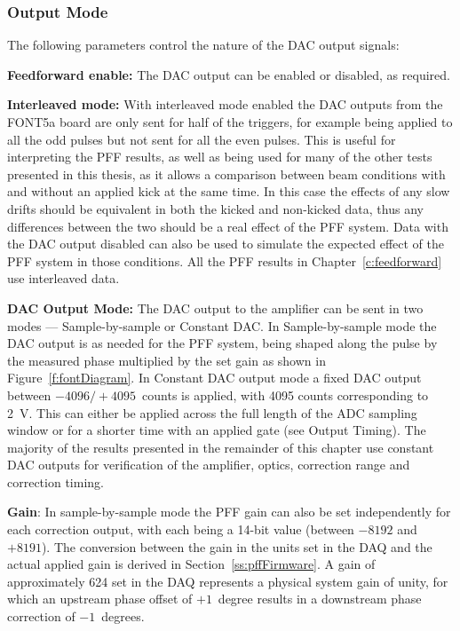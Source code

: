 \subsubsection{Output Mode}

The following parameters control the nature of the DAC output signals:

\textbf{Feedforward enable:} The DAC output can be enabled or disabled, as required.

\textbf{Interleaved mode:} With interleaved mode enabled the DAC outputs from the FONT5a board are only sent for half of the triggers, for example being applied to all the odd pulses but not sent for all the even pulses. This is useful for interpreting the PFF results, as well as being used for many of the other tests presented in this thesis, as it allows a comparison between beam conditions with and without an applied kick at the same time. In this case the effects of any slow drifts should be equivalent in both the kicked and non-kicked data, thus any differences between the two should be a real effect of the PFF system. Data with the DAC output disabled can also be used to simulate the expected effect of the PFF system in those conditions. All the PFF results in Chapter~\ref{c:feedforward} use interleaved data.

\textbf{DAC Output Mode:} The DAC output to the amplifier can be sent in two modes --- Sample-by-sample or Constant DAC. In Sample-by-sample mode the DAC output is as needed for the PFF system, being shaped along the pulse by the measured phase multiplied by the set gain as shown in Figure~\ref{f:fontDiagram}. 
In Constant DAC output mode a fixed DAC output between  \(-4096/+4095\)~counts is applied, with 4095 counts corresponding to 2~V. This can either be applied across the full length of the ADC sampling window or for a shorter time with an applied gate (see Output Timing). 
The majority of the results presented in the remainder of this chapter use constant DAC outputs for verification of the amplifier, optics, correction range and correction timing.


\textbf{Gain}: In sample-by-sample mode the PFF gain can also be set independently for each correction output, with each being a 14-bit value (between \(-8192\) and \(+8191\)). The conversion between the gain in the units set in the DAQ and the actual applied gain is derived in Section~\ref{ss:pffFirmware}. A gain of approximately 624 set in the DAQ represents a physical system gain of unity, for which an upstream phase offset of \(+1\)~degree results in a downstream phase correction of \(-1\)~degrees.


